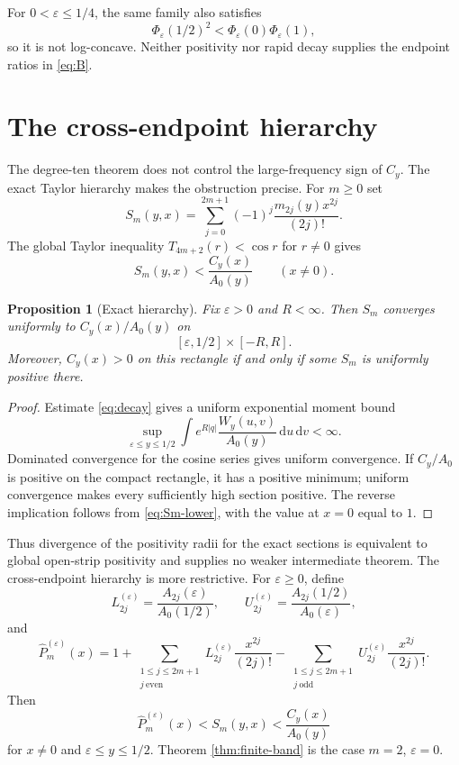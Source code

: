 \documentclass[11pt]{amsart}
\newtheorem{proposition}[theorem]{Proposition}
\theoremstyle{remark}
\newcommand{\dd}{\,\mathrm{d}}
\begin{document}
For $0<\varepsilon\leq1/4$, the same family also satisfies
\[
\Phi_\varepsilon(1/2)^2<
\Phi_\varepsilon(0)\Phi_\varepsilon(1),
\]
so it is not log-concave.  Neither positivity nor rapid decay supplies the
endpoint ratios in \eqref{eq:B}.

\section{The cross-endpoint hierarchy}

The degree-ten theorem does not control the large-frequency sign of $C_y$.
The exact Taylor hierarchy makes the obstruction precise.  For $m\geq0$ set
\begin{equation}\label{eq:Sm}
S_m(y,x)=\sum_{j=0}^{2m+1}(-1)^j
\frac{m_{2j}(y)x^{2j}}{(2j)!}.
\end{equation}
The global Taylor inequality
$T_{4m+2}(r)<\cos r$ for $r\neq0$ gives
\begin{equation}\label{eq:Sm-lower}
S_m(y,x)<\frac{C_y(x)}{A_0(y)}
\qquad(x\neq0).
\end{equation}

\begin{proposition}[Exact hierarchy]\label{prop:exact-hierarchy}
Fix $\varepsilon>0$ and $R<\infty$.  Then $S_m$ converges uniformly to
$C_y(x)/A_0(y)$ on
\[
[\varepsilon,1/2]\times[-R,R].
\]
Moreover, $C_y(x)>0$ on this rectangle if and only if some $S_m$ is
uniformly positive there.
\end{proposition}

\begin{proof}
Estimate \eqref{eq:decay} gives a uniform exponential moment bound
\[
\sup_{\varepsilon\leq y\leq1/2}
\int e^{R|q|}\frac{W_y(u,v)}{A_0(y)}\dd u\dd v<\infty.
\]
Dominated convergence for the cosine series gives uniform convergence.  If
$C_y/A_0$ is positive on the compact rectangle, it has a positive minimum;
uniform convergence makes every sufficiently high section positive.  The
reverse implication follows from \eqref{eq:Sm-lower}, with the value at
$x=0$ equal to $1$.
\end{proof}

Thus divergence of the positivity radii for the exact sections is equivalent
to global open-strip positivity and supplies no weaker intermediate theorem.
The cross-endpoint hierarchy is more restrictive.  For $\varepsilon\geq0$,
define
\[
L_{2j}^{(\varepsilon)}=
\frac{A_{2j}(\varepsilon)}{A_0(1/2)},
\qquad
U_{2j}^{(\varepsilon)}=
\frac{A_{2j}(1/2)}{A_0(\varepsilon)},
\]
and
\begin{equation}\label{eq:Phat}
\widehat P_m^{(\varepsilon)}(x)=
1+
\sum_{\substack{1\leq j\leq2m+1\\ j\ \mathrm{even}}}
L_{2j}^{(\varepsilon)}\frac{x^{2j}}{(2j)!}
-
\sum_{\substack{1\leq j\leq2m+1\\ j\ \mathrm{odd}}}
U_{2j}^{(\varepsilon)}\frac{x^{2j}}{(2j)!}.
\end{equation}
Then
\[
\widehat P_m^{(\varepsilon)}(x)
<S_m(y,x)<\frac{C_y(x)}{A_0(y)}
\]
for $x\neq0$ and $\varepsilon\leq y\leq1/2$.  Theorem
\ref{thm:finite-band} is the case $m=2$, $\varepsilon=0$.
\end{document}
